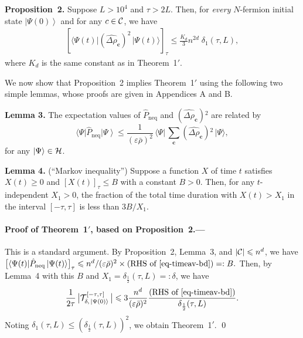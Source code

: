 \documentclass[aps,prl,superscriptaddress,reprint]{revtex4-2}
\newcommand{\se}[1]{\paragraph{#1.---}}
\newcommand{\bfthm}[1]{\noindent\textbf{#1}}
\theoremstyle{definition}
\newcommand{\abs}[1]{{\left\vert #1 \right\vert}}
\newcommand{\paren}[1]{{\left( #1 \right)}}
\newcommand{\nparen}[1]{{( #1 )}}
\newcommand{\brak}[1]{{\left[ #1 \right]}}
\newcommand{\HH}{{\cal H}}
\newcommand{\CC}{{\cal C}}
\newcommand{\TT}{{\cal T}}
\newcommand{\ba}[1]{\bar{#1}}
\newcommand{\ket}[1]{\left|{#1}\right\rangle}
\newcommand{\bra}[1]{\langle{#1}|}
\newcommand{\sw}[2]{\bra{#1}{#2}\ket{#1}}
\newcommand{\wh}{\widehat}
\newcommand{\ta}{\tau}
\renewcommand{\d}{\delta}
\newcommand{\De}{\varDelta}
\newcommand{\ep}{\varepsilon}
\renewcommand{\r}{\rho}
\newcommand{\f}{\frac}
\newcommand{\ve}[1]{\boldsymbol{#1}}
\renewcommand{\ge}{\geqslant}
\renewcommand{\le}{\leqslant}
\newcommand{\tx}{\text}
\newcommand{\neqb}{_\mathrm{neq}}
\newcommand{\nqb}{\neqb}
\newcommand{\bd}{\delta}
\begin{document}
\smallskip

\bfthm{Proposition~2. }
Suppose
$L>10^4$ and $\ta>2L$.
Then, for \emph{every} $N$-fermion initial state $\ket{\Psi(0)}$
and for any $c \in {\cal C}$,
we have
\begin{align}
  	\brak{ \bigl \langle \Psi(t) \big | (\wh{\De\r}_{\ve c})^2 \, \big | \Psi(t) \bigr \rangle }_\ta
  	\le
  	\f{K_d}3
  	{n^{2d}}\;
  	\bd_1(\ta,L),
  	\label{eq-timeav-bd}
\end{align}
where $K_d$ is the same constant as in Theorem~1$'$.

\smallskip




We now show that Proposition~2 implies Theorem~1$'$
using the following two simple lemmas,
whose proofs are given in Appendices A and B.

\smallskip

\bfthm{Lemma 3.}
The expectation values of
$\hat{P}\nqb$ and $ (\wh{\De\r}_{\ve c}){}^2$ are related by
\begin{equation}
  	\sw\Psi {\hat{P}\nqb}
  	\le
  	\frac{1}{(\ep\ba\r)^2} \,
  	\bigl \langle \Psi \big | \,
  	{  \sum_{\ve c}  (\wh{\De\r}_{\ve c}){}^2}
  	\, \big | \Psi \bigr \rangle,
\end{equation}
for any $\ket\Psi\in\HH$.

\smallskip

\bfthm{Lemma 4.} (``Markov inequality'')
Suppose a function $X$ of time $t$ satisfies
$X(t)\ge0$ and $\brak{X(t)}_\ta\le B$ with a
constant $B>0$.
Then, for any $t$-independent $X_1>0$,
the fraction of the total time duration
with $X(t)>X_1$ in the interval $[-\ta,\ta]$
is less than $3 B/X_1$.

\smallskip

\se{Proof of Theorem~1$'$, based on Proposition~2}
This is a standard argument.
By Proposition~2, Lemma~3, and $\abs \CC\le n^d$,
we have
$
  	\bigl [ \sw{\Psi(t)} {\hat{P}\nqb} \bigr ]_\ta
  	\le n^d/{(\ep\ba\r)^2}
  	\times
  	\paren{\tx{RHS of \eqref{eq-timeav-bd}}}
  	=:B.
$
Then, by Lemma~4 with this $B$
and $X_1=\bd_{\f12}(\ta,L)=:\d$, we have
\begin{align}
	\frac{1}{2 \tau} \, \bigl | \TT^{[-\tau, \tau]}_{\delta,
  \,\ket{\Psi(0)}} \, \bigr |
  	\le
  	3
  	\f{n^d}{(\ep\ba\r)^2}
  	\f{\paren{\tx{RHS of \eqref{eq-timeav-bd}}}}
  	{\bd_{\f12}(\ta,L)}.
\end{align}
Noting
$\bd_{1}(\ta,L)\le \nparen{ \bd_{\f12}(\ta,L) }^2$,
we obtain Theorem~1$'$.
\qed

\medskip
\end{document}
